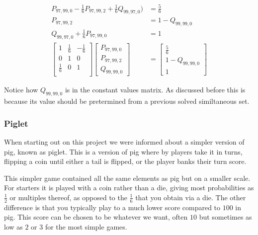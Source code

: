 \documentclass[a4paper,titlepage]{article}
\begin{document}
\begin{align*}
	P_{97,99,0} - \frac{1}{6}P_{97,99,2} + \frac{1}{6}Q_{99,97,0}) &= \frac{5}{6}\\
	P_{97,99,2}                                                    &= 1 - Q_{99,99,0}\\
	Q_{99,97,0} + \frac{1}{6}P_{97,99,0}                           &= 1\\
	\begin{bmatrix}
		1           & \frac{1}{6} & -\frac{1}{6}\\
		0           & 1           & 0\\
		\frac{1}{6} & 0           & 1\\
	\end{bmatrix}
	\begin{bmatrix}
		P_{97,99,0}\\
		P_{97,99,2}\\
		Q_{99,99,0}
	\end{bmatrix}
	& =
	\begin{bmatrix}
		\frac{5}{6}\\
		1 - Q_{99,99,0}\\
		1
	\end{bmatrix}
\end{align*}

Notice how $Q_{99,99,0}$ is in the constant values matrix. As discussed before this is because its value should be pretermined from a previous solved similtaneous set.



\subsubsection{Piglet}
When starting out on this project we were informed about a simpler version of pig, known as piglet. This is a version of pig
where by players take it in turns, flipping a coin until either a tail is flipped, or the player banks their turn score.

This simpler game contained all the same elements as pig but on a smaller scale. For starters it is played with a coin rather than a die,
giving most probabilities as $\frac{1}{2}$ or multiples thereof, as opposed to the $\frac{1}{6}$ that you obtain via a die.
The other difference is that you typically play to a much lower score compared to $100$ in pig. This score can be chosen to be whatever we want, often $10$ but sometimes as low as $2$ or $3$ for the most simple games.
\end{document}
